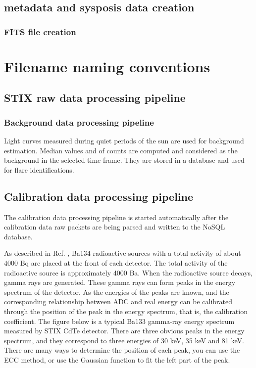 \documentclass{aa}
\begin{document}
\subsection{metadata and sysposis data creation}



\subsubsection{FITS file creation}


\section{Filename naming conventions}

\subsection{STIX raw data processing pipeline}

\subsubsection{Background data processing pipeline}
Light curves measured during quiet periods of the sun are used for background estimation. Median values and of counts are computed and considered as the background in the selected time frame. They are stored in a database and used for flare identifications. 

\subsection{Calibration data processing pipeline}
The calibration data processing pipeline is started automatically after the calibration data raw packets
are being parsed and written to the NoSQL database.


As described in Ref. \cite{StixInstrument},  Ba134 radioactive sources with a total activity of about 4000 Bq are placed at the front of each detector. The total activity of the radioactive source is approximately 4000 Ba.
When the radioactive source decays, gamma rays are generated. These gamma rays can form peaks in the energy spectrum of the detector.
As the energies of the peaks are known, and the corresponding relationship between ADC and real energy can be calibrated through the position of the peak in the energy spectrum, that is, the calibration coefficient. The figure below is a typical Ba133 gamma-ray energy spectrum measured by STIX CdTe detector. There are three obvious peaks in the energy spectrum, and they correspond to three energies of 30 keV, 35 keV and 81 keV. There are many ways to determine the position of each peak, you can use the ECC method, or use the Gaussian function to fit the left part of the peak.
\end{document}
